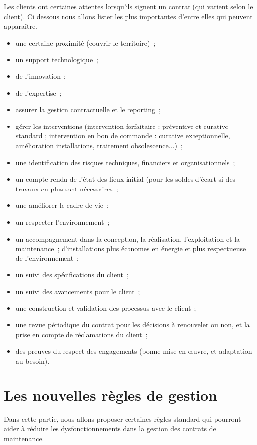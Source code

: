 	Les clients ont certaines attentes lorsqu'ils signent un contrat (qui varient selon le client). Ci dessous nous allons lister les plus importantes d'entre elles qui peuvent apparaître.

\begin{itemize}
	\item une certaine proximité (couvrir le territoire)~;
	\item un support technologique~;
	\item de l'innovation~;
	\item de l'expertise~;

	\item assurer la gestion contractuelle et le reporting~;
	\item gérer les interventions (intervention forfaitaire : préventive et curative standard ; intervention en bon de commande : curative exceptionnelle, amélioration installations, traitement obsolescence...)~;
	\item une identification des risques techniques, financiers et organisationnels~;
	\item un compte rendu de l'état des lieux initial (pour les soldes d'écart si des travaux en plus sont nécessaires~;

	\item une améliorer le cadre de vie~;
	\item un respecter l'environnement~;

	\item un accompagnement dans la conception, la réalisation, l'exploitation et la maintenance~; d'installations plus économes en énergie et plus respectueuse de l'environnement~;
	\item un suivi des spécifications du client~;
	\item un suivi des avancements pour le client~;
	\item une construction et validation des processus avec le client~;
	\item une revue périodique du contrat pour les décisions à renouveler ou non, et la prise en compte de réclamations du client~;
	\item des preuves du respect des engagements (bonne mise en œuvre, et adaptation au besoin).
\end{itemize}


\section{Les nouvelles règles de gestion}
    Dans cette partie, nous allons proposer certaines règles standard qui pourront aider à réduire les dysfonctionnements dans la gestion des contrats de maintenance.


